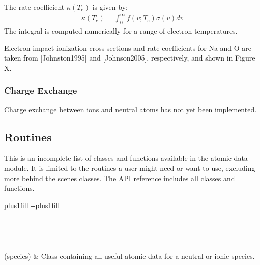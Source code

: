 \documentclass[letterpaper,10pt,english]{sphinxmanual}
\begin{document}
\sphinxAtStartPar
The rate coefficient \(\kappa(T_e)\) is given by:
\begin{equation*}
\begin{split}\kappa(T_e) = \int_0^\infty f(v; T_e) \sigma(v) dv\end{split}
\end{equation*}
\sphinxAtStartPar
The integral is computed numerically for a range of electron temperatures.

\sphinxAtStartPar
Electron impact ionization cross sections and rate coefficients for Na and O are
taken
from {[}Johnston1995{]} and {[}Johnson2005{]}, respectively, and shown in Figure X.

\noindent{}


\subsubsection{Charge Exchange}
\label{\detokenize{nexoclom2/atomicdata:charge-exchange}}
\sphinxAtStartPar
Charge exchange between ions and neutral atoms has not yet been implemented.


\subsection{Routines}
\label{\detokenize{nexoclom2/atomicdata:routines}}
\sphinxAtStartPar
This is an incomplete list of classes and functions available in the atomic data
module. It is limited to the routines a user might need or want to use, excluding
more behind the scenes classes. The API reference includes all classes and
functions.


\begin{savenotes}
\sphinxatlongtablestart
\sphinxthistablewithglobalstyle
\sphinxthistablewithnovlinesstyle
\makeatletter
  \LTleft \@totalleftmargin plus1fill
  \LTright\dimexpr\columnwidth-\@totalleftmargin-\linewidth\relax plus1fill
\makeatother
\begin{longtable}{}
\sphinxtoprule
\endfirsthead

\\
\sphinxtoprule
\endhead

\sphinxbottomrule
{}\\
\endfoot

\endlastfoot
\sphinxtableatstartofbodyhook

\sphinxAtStartPar
{\hyperref[\detokenize{nexoclom2/nexoclom2.atomicdata.atom:nexoclom2.atomicdata.atom.Atom}]{}}(species)
&
\sphinxAtStartPar
Class containing all useful atomic data for a neutral or ionic species.
\\
\sphinxbottomrule
\end{longtable}
\sphinxtableafterendhook
\sphinxatlongtableend
\end{savenotes}
\end{document}
